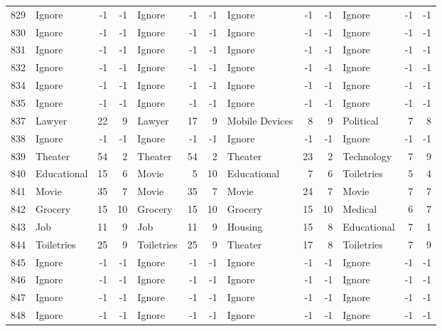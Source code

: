 \begin{figure}[htbp]
\begin{tabular}{rlrrlrrlrrlrr}
    829   & Ignore & -1    & -1    & Ignore & -1    & -1    & Ignore & -1    & -1    & Ignore & -1    & -1 \\
    830   & Ignore & -1    & -1    & Ignore & -1    & -1    & Ignore & -1    & -1    & Ignore & -1    & -1 \\
    831   & Ignore & -1    & -1    & Ignore & -1    & -1    & Ignore & -1    & -1    & Ignore & -1    & -1 \\
    832   & Ignore & -1    & -1    & Ignore & -1    & -1    & Ignore & -1    & -1    & Ignore & -1    & -1 \\
    834   & Ignore & -1    & -1    & Ignore & -1    & -1    & Ignore & -1    & -1    & Ignore & -1    & -1 \\
    835   & Ignore & -1    & -1    & Ignore & -1    & -1    & Ignore & -1    & -1    & Ignore & -1    & -1 \\
    837   & Lawyer & 22    & 9     & Lawyer & 17    & 9     & Mobile Devices & 8     & 9     & Political & 7     & 8 \\
    838   & Ignore & -1    & -1    & Ignore & -1    & -1    & Ignore & -1    & -1    & Ignore & -1    & -1 \\
    839   & Theater & 54    & 2     & Theater & 54    & 2     & Theater & 23    & 2     & Technology & 7     & 9 \\
    840   & Educational & 15    & 6     & Movie & 5     & 10    & Educational & 7     & 6     & Toiletries & 5     & 4 \\
    841   & Movie & 35    & 7     & Movie & 35    & 7     & Movie & 24    & 7     & Movie & 7     & 7 \\
    842   & Grocery & 15    & 10    & Grocery & 15    & 10    & Grocery & 15    & 10    & Medical & 6     & 7 \\
    843   & Job   & 11    & 9     & Job   & 11    & 9     & Housing & 15    & 8     & Educational & 7     & 1 \\
    844   & Toiletries & 25    & 9     & Toiletries & 25    & 9     & Theater & 17    & 8     & Toiletries & 7     & 9 \\
    845   & Ignore & -1    & -1    & Ignore & -1    & -1    & Ignore & -1    & -1    & Ignore & -1    & -1 \\
    846   & Ignore & -1    & -1    & Ignore & -1    & -1    & Ignore & -1    & -1    & Ignore & -1    & -1 \\
    847   & Ignore & -1    & -1    & Ignore & -1    & -1    & Ignore & -1    & -1    & Ignore & -1    & -1 \\
    848   & Ignore & -1    & -1    & Ignore & -1    & -1    & Ignore & -1    & -1    & Ignore & -1    & -1 \\

\end{tabular}
\end{figure}
